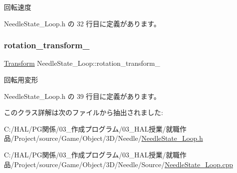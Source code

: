 回転速度 



 Needle\+State\+\_\+\+Loop.\+h の 32 行目に定義があります。

\mbox{\label{class_needle_state___loop_adbc09dcbbc7367754c5c14aa4ded7497}} 
\subsubsection{\texorpdfstring{rotation\+\_\+transform\+\_\+}{rotation\_transform\_}}
{\footnotesize\ttfamily \mbox{\hyperlink{class_transform}{Transform}} Needle\+State\+\_\+\+Loop\+::rotation\+\_\+transform\+\_\+\hspace{0.3cm}{\ttfamily [private]}}



回転用変形 



 Needle\+State\+\_\+\+Loop.\+h の 39 行目に定義があります。



このクラス詳解は次のファイルから抽出されました\+:\begin{DoxyCompactItemize}
\item 
C\+:/\+H\+A\+L/\+P\+G関係/03\+\_\+作成プログラム/03\+\_\+\+H\+A\+L授業/就職作品/\+Project/source/\+Game/\+Object/3\+D/\+Needle/\mbox{\hyperlink{_needle_state___loop_8h}{Needle\+State\+\_\+\+Loop.\+h}}\item 
C\+:/\+H\+A\+L/\+P\+G関係/03\+\_\+作成プログラム/03\+\_\+\+H\+A\+L授業/就職作品/\+Project/source/\+Game/\+Object/3\+D/\+Needle/\+Source/\mbox{\hyperlink{_needle_state___loop_8cpp}{Needle\+State\+\_\+\+Loop.\+cpp}}\end{DoxyCompactItemize}
